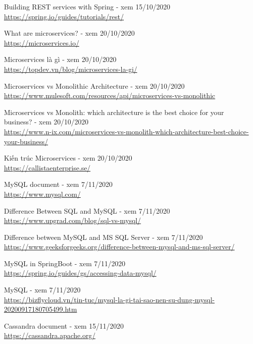\documentclass[12pt,a4paper,oneside]{book}
\begin{document}
\begin{thebibliography}{80}
        \bibitem{} Building REST services with Spring - xem 15/10/2020\\
        \url{https://spring.io/guides/tutorials/rest/} 
        
         \bibitem{} What are microservices? - xem 20/10/2020\\
        \url{https://microservices.io/} 
        
        \bibitem{} Microservices là gì - xem 20/10/2020\\
        \url{https://topdev.vn/blog/microservices-la-gi/} 
        
        \bibitem{} Microservices vs Monolithic Architecture - xem 20/10/2020\\
        \url{https://www.mulesoft.com/resources/api/microservices-vs-monolithic}
        
        \bibitem{} Microservices vs Monolith: which architecture is the best choice for your business? - xem 20/10/2020\\
        \url{https://www.n-ix.com/microservices-vs-monolith-which-architecture-best-choice-your-business/}
        
        \bibitem{} Kiến trúc Microservices - xem 20/10/2020\\
        \url{https://callistaenterprise.se/}
        
        \bibitem{} MySQL document - xem 7/11/2020\\
        \url{https://www.mysql.com/}
        
        \bibitem{} Difference Between SQL and MySQL - xem 7/11/2020\\
        \url{https://www.upgrad.com/blog/sql-vs-mysql/}
        
        \bibitem{} Difference between MySQL and MS SQL Server - xem 7/11/2020\\
        \url{https://www.geeksforgeeks.org/difference-between-mysql-and-ms-sql-server/}
        
         \bibitem{} MySQL in SpringBoot - xem 7/11/2020\\
        \url{https://spring.io/guides/gs/accessing-data-mysql/}
        
        \bibitem{} MySQL - xem 7/11/2020\\
        \url{https://bizflycloud.vn/tin-tuc/mysql-la-gi-tai-sao-nen-su-dung-mysql-20200917180705499.htm}
        
        \bibitem{} Cassandra document - xem 15/11/2020\\
        \url{https://cassandra.apache.org/}
        

\end{thebibliography}
\end{document}
